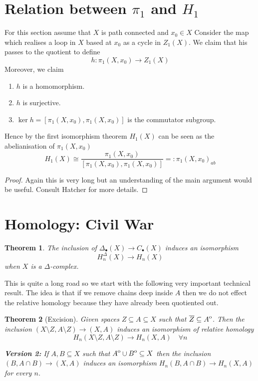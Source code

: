 \documentclass[11pt]{article}
\newcommand{\eqdef}{=:}
\newcommand{\interior}[1]{%
  {\kern0pt#1}^{\mathrm{o}}%
}
\newcommand{\mdf}[1]{{\color{red} #1}}
\newtheorem{theorem}{Theorem}[section]
\begin{document}
\section{Relation between $\pi_1$ and $H_1$}
For this section assume that $X$ is path connected and $x_0\in X$
Consider the map which realises a loop in $X$ based at $x_0$ as a cycle in $Z_1(X)$.
We claim that his passes to the quotient to define
\[
	h: \pi_1(X, x_0) \to Z_1(X)
\]
Moreover, we claim
\begin{enumerate}[label=(\roman*)]
	\item $h$ is a homomorphism.
	\item $h$ is surjective.
	\item $\ker h= \left[ \pi_1(X, x_0), \pi_1(X, x_0)\right]$ is the commutator subgroup.
\end{enumerate}
Hence by the first isomorphism theorem $H_1(X)$ can be seen as the \mdf{abelianisation} of $\pi_1(X, x_0)$
\[
	H_1(X) \cong \frac{\pi_1(X, x_0)}{\left[ \pi_1(X, x_0), \pi_1(X, x_0)\right]} \eqdef \pi_1(X, x_0)_{ab}
\]

\begin{proof}
Again this is very long but an understanding of the main argument would be useful.
Consult Hatcher for more details.
\end{proof}

\section{Homology: Civil War}
\begin{theorem}
The inclusion of $\Delta_\bullet(X) \to C_\bullet(X)$ induces an isomorphism
\[
	H_n^\Delta(X) \to H_n(X)
\]
when $X$ is a $\Delta$-complex.
\end{theorem}

This is quite a long road so we start with the following very important technical result.
The idea is that if we remove chains deep inside $A$ then we do not effect the relative homology because they have already been quotiented out.

\begin{theorem}[Excision]
Given spaces $Z\subseteq A\subseteq X$ such that $\overline{Z}\subseteq\interior{A}$.
Then the inclusion $(X \setminus Z, A\setminus Z) \to (X, A)$ induces an isomorphism of relative homology
\[
	H_n(X \setminus Z, A \setminus Z) \to H_n(X, A)\quad \forall n
\]

\textbf{Version 2: } If $A, B \subseteq X$ such that $\interior{A} \cup \interior{B} \subseteq X$ then the inclusion $(B, A \cap B) \to (X, A)$ induces an isomorphism $H_n(B, A\cap B) \to H_n(X,A)$ for every $n$.
\end{theorem}
\end{document}
